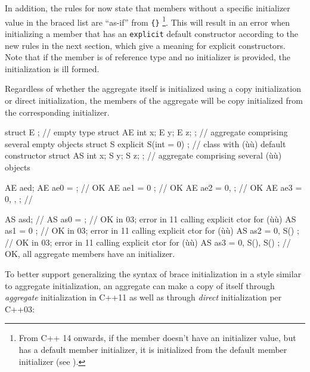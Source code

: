 \noindent In addition, the rules for  now state that
members without a specific initializer value in the braced list are
``as-if''  from \lstinline!{}!
{\cprotect\footnote{From C++ 14 onwards, if the member doesn't have an
initializer value, but has a default member initializer, it is
initialized from the default member initializer (see ).}}.
This will result in an error when
initializing a member that has an \lstinline!explicit! default constructor
according to the new  rules in
the next section, which give a meaning for explicit constructors. Note
that if the member is of reference type and no initializer is provided,
the initialization is ill formed.

Regardless of whether the aggregate itself is initialized using a copy
initialization or direct initialization, the members of the aggregate
will be copy initialized from the corresponding initializer.

\begin{emcppslisting}
struct E { };                         // empty type
struct AE { int x; E y; E z; };       // aggregate comprising several empty objects
struct S { explicit S(int = 0) {} };  // class with (ù{}ù) default constructor
struct AS{ int x; S y; S z; };        // aggregate comprising several (ù{}ù) objects

AE aed;
AE ae0 = {};               // OK
AE ae1 = { 0 };            // OK
AE ae2 = { 0, {} };        // OK
AE ae3 = { 0, {}, {} };    //

AS asd;                    //
AS as0 = {};               // OK in 03; error in 11 calling explicit ctor for (ù{}ù)
AS as1 = { 0 };            // OK in 03; error in 11 calling explicit ctor for (ù{}ù)
AS as2 = { 0, S() };       // OK in 03; error in 11 calling explicit ctor for (ù{}ù)
AS as3 = { 0, S(), S() };  // OK, all aggregate members have an initializer.
\end{emcppslisting}


\noindent To better support generalizing the syntax of brace initialization in a
style similar to aggregate initialization, an aggregate can make a copy
of itself through \emph{aggregate} initialization in C++11 as well as
through \emph{direct} initialization per C++03:

